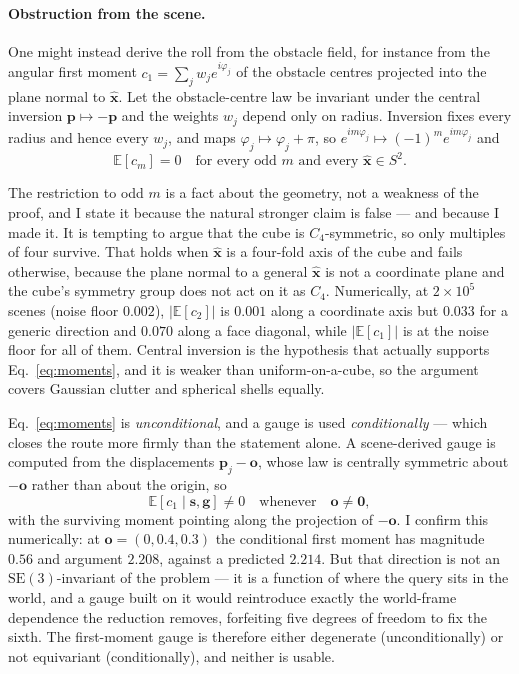 \documentclass[11pt,a4paper]{article}
\newcommand{\xhat}{\hat{\mathbf{x}}}
\newcommand{\svec}{\mathbf{s}}
\newcommand{\gvec}{\mathbf{g}}
\newcommand{\SE}{\mathrm{SE}(3)}
\begin{document}
\paragraph{Obstruction from the scene.} One might instead derive the roll from
the obstacle field, for instance from the angular first moment
$c_1 = \sum_j w_j e^{i\varphi_j}$ of the obstacle centres projected into the
plane normal to $\xhat$. Let the obstacle-centre law be invariant under the
central inversion $\mathbf{p} \mapsto -\mathbf{p}$ and the weights $w_j$ depend
only on radius. Inversion fixes every radius and hence every $w_j$, and maps
$\varphi_j \mapsto \varphi_j + \pi$, so $e^{im\varphi_j} \mapsto (-1)^m
e^{im\varphi_j}$ and
\begin{equation}
  \mathbb{E}[c_m] = 0 \quad \text{for every odd } m \text{ and every }
  \xhat \in S^2 .
  \label{eq:moments}
\end{equation}

The restriction to odd $m$ is a fact about the geometry, not a weakness of the
proof, and I state it because the natural stronger claim is false --- and because
I made it. It is tempting to argue that the cube is $C_4$-symmetric, so only
multiples of four survive. That holds when $\xhat$ is a four-fold axis of the
cube and fails otherwise, because the plane normal to a general $\xhat$ is not a
coordinate plane and the cube's symmetry group does not act on it as $C_4$.
Numerically, at $2 \times 10^5$ scenes (noise floor $0.002$), $|\mathbb{E}[c_2]|$
is $0.001$ along a coordinate axis but $0.033$ for a generic direction and
$0.070$ along a face diagonal, while $|\mathbb{E}[c_1]|$ is at the noise floor for
all of them. Central inversion is the hypothesis that actually supports
Eq.~\eqref{eq:moments}, and it is weaker than uniform-on-a-cube, so the argument
covers Gaussian clutter and spherical shells equally.

Eq.~\eqref{eq:moments} is \emph{unconditional}, and a gauge is used
\emph{conditionally} --- which closes the route more firmly than the statement
alone. A scene-derived gauge is computed from the displacements
$\mathbf{p}_j - \mathbf{o}$, whose law is centrally symmetric about
$-\mathbf{o}$ rather than about the origin, so
\begin{equation}
  \mathbb{E}[c_1 \mid \svec, \gvec] \neq 0
  \quad\text{whenever}\quad \mathbf{o} \neq \mathbf{0},
  \label{eq:cond}
\end{equation}
with the surviving moment pointing along the projection of $-\mathbf{o}$. I
confirm this numerically: at $\mathbf{o} = (0, 0.4, 0.3)$ the conditional first
moment has magnitude $0.56$ and argument $2.208$, against a predicted $2.214$.
But that direction is not an $\SE$-invariant of the problem --- it is a function
of where the query sits in the world, and a gauge built on it would reintroduce
exactly the world-frame dependence the reduction removes, forfeiting five degrees
of freedom to fix the sixth. The first-moment gauge is therefore either
degenerate (unconditionally) or not equivariant (conditionally), and neither is
usable.
\end{document}
